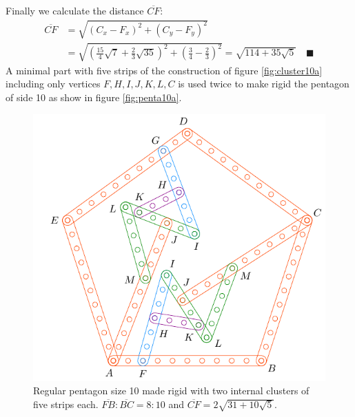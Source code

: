 \documentclass[11pt]{article}
\begin{document}
Finally we calculate the distance $\overline{CF}$:
\begin{align}
\overline{CF} &= \sqrt{(C_x - F_x)^2 + (C_y - F_y)^2}\nonumber\\
 &= \sqrt{\left(\frac{15}{4}\sqrt7 + \frac{2}{3}\sqrt{35}\right)^2
 + \left(\frac{3}4 - \frac{2}3\right)^2} %
 = \sqrt{114+35\sqrt5} \quad\blacksquare
\end{align}
A minimal part with five strips of the construction of figure \ref{fig:cluster10a} including only vertices $F,H,I,J,K,L,C$ is used twice to make rigid the pentagon of side 10 as show in figure \ref{fig:penta10a}.

\begin{figure}[H]
 \centering
 \includegraphics[scale=0.9]{10/penta10b}
 \caption{Regular pentagon size 10 made rigid with two internal clusters of five strips each. $\overline{FB}:\overline{BC} = 8:10$ and $\overline{CF} = 2\sqrt{31 + 10\sqrt5}$.}
 \label{fig:penta10b}
\end{figure}
\end{document}

